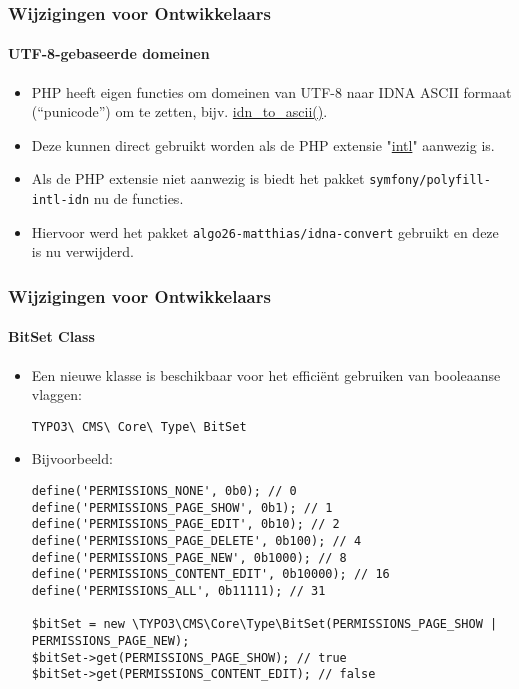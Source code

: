 \begin{frame}[fragile]
	\frametitle{Wijzigingen voor Ontwikkelaars}
	\framesubtitle{UTF-8-gebaseerde domeinen}

	\begin{itemize}
		\item PHP heeft eigen functies om domeinen van UTF-8 naar IDNA ASCII formaat (“punicode”) om te zetten,
			bijv. \href{https://www.php.net/manual/en/function.idn-to-ascii.php}{idn\_to\_ascii()}.

		\item Deze kunnen direct gebruikt worden als de PHP extensie
			"\href{https://www.php.net/manual/en/book.intl.php}{intl}" aanwezig is.

		\item Als de PHP extensie niet aanwezig is biedt het pakket \texttt{symfony/polyfill-intl-idn}
			nu de functies.

		\item Hiervoor werd het pakket \texttt{algo26-matthias/idna-convert} gebruikt en deze is nu verwijderd.

	\end{itemize}

\end{frame}


\begin{frame}[fragile]
	\frametitle{Wijzigingen voor Ontwikkelaars}
	\framesubtitle{BitSet Class}

	\lstset{basicstyle=\tiny\ttfamily}

	\begin{itemize}
		\item Een nieuwe klasse is beschikbaar voor het efficiënt gebruiken van booleaanse vlaggen:\newline

			\texttt{TYPO3\textbackslash
				CMS\textbackslash
				Core\textbackslash
				Type\textbackslash
				BitSet}

		\item Bijvoorbeeld:

\begin{lstlisting}
define('PERMISSIONS_NONE', 0b0); // 0
define('PERMISSIONS_PAGE_SHOW', 0b1); // 1
define('PERMISSIONS_PAGE_EDIT', 0b10); // 2
define('PERMISSIONS_PAGE_DELETE', 0b100); // 4
define('PERMISSIONS_PAGE_NEW', 0b1000); // 8
define('PERMISSIONS_CONTENT_EDIT', 0b10000); // 16
define('PERMISSIONS_ALL', 0b11111); // 31

$bitSet = new \TYPO3\CMS\Core\Type\BitSet(PERMISSIONS_PAGE_SHOW | PERMISSIONS_PAGE_NEW);
$bitSet->get(PERMISSIONS_PAGE_SHOW); // true
$bitSet->get(PERMISSIONS_CONTENT_EDIT); // false
\end{lstlisting}

	\end{itemize}

\end{frame}

